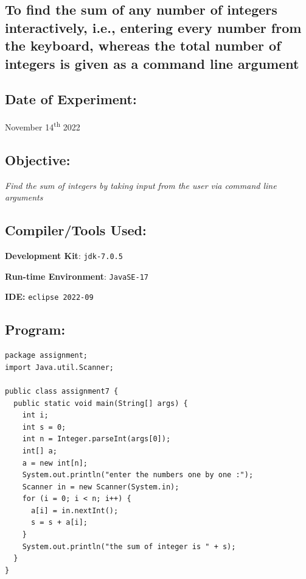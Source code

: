 \documentclass[12pt, a4paper]{article}
\begin{document}
\begin{tcolorbox}
\section{To find the sum of any number of integers interactively, i.e., entering every number from the keyboard, whereas the total number of integers is given as a command line argument}
\end{tcolorbox}

\subsection*{Date of Experiment:}
November 14\textsuperscript{th} 2022
\subsection*{Objective:}
\emph{\large{Find the sum of integers by taking input from the user via command line arguments}}

\subsection*{Compiler/Tools Used:}
\textbf{Development Kit}: \verb+jdk-7.0.5+

\textbf{Run-time Environment}: \verb+JavaSE-17+

\textbf{IDE:} \verb+eclipse 2022-09+

\subsection*{Program:}
\begin{lstlisting}
package assignment;
import Java.util.Scanner;

public class assignment7 {
  public static void main(String[] args) {
    int i;
    int s = 0;
    int n = Integer.parseInt(args[0]);
    int[] a;
    a = new int[n];
    System.out.println("enter the numbers one by one :");
    Scanner in = new Scanner(System.in);
    for (i = 0; i < n; i++) {
      a[i] = in.nextInt();
      s = s + a[i];
    }
    System.out.println("the sum of integer is " + s);
  }
}
\end{lstlisting}
\end{document}
